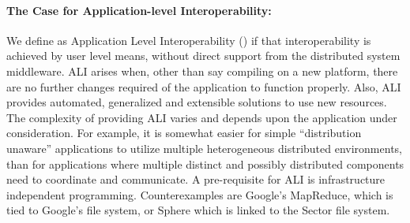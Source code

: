 \documentclass[3p,twocolumn]{elsarticle}
\begin{document}




\paragraph{The Case for Application-level Interoperability:}

We define as Application Level Interoperability () if that
interoperability is achieved by user level means, without direct support
from the distributed system middleware.  ALI arises when, other than say
compiling on a new platform, there are no further changes required of
the application to function properly.  Also, ALI provides automated,
generalized and extensible solutions to use new resources.
 The complexity of providing ALI varies and depends
upon the application under consideration.  For example, it is somewhat
easier for simple ``distribution unaware'' applications to utilize
multiple heterogeneous distributed environments, than for applications
where multiple distinct and possibly distributed components need to
coordinate and communicate.  A pre-requisite for ALI is infrastructure
independent programming.  Counterexamples are Google's MapReduce, which
is tied to Google's file system, or Sphere \cite{sectorsphere09} which is
linked to the Sector file system.
\end{document}
